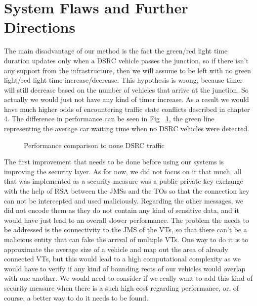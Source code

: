 \documentclass[17pt]{report}
\begin{document}
\section{System Flaws and Further Directions}
\indent \indent
The main disadvantage of our method is the fact the
green/red light time duration updates only when a DSRC vehicle
passes the junction, so if there isn't any support from the infrastructure,
then we will assume to be left with no green light/red light time increase/decrease.
This hypothesis is wrong, because timer will still decrease 
based on the number of vehicles that arrive at the junction. So actually
we would just not have any kind of timer increase. As a result we would 
have much higher odds of encountering traffic state conflicts described in 
chapter 4. The difference in performance can be seen in Fig 
~\ref{fig:All Optimizer vs no timer duration update}, the green line 
representing the average car waiting time when no DSRC vehicles were 
detected.
\begin{figure}[h!]
    \centering
    \label{fig:All Optimizer vs no timer duration update}
    \caption{Performance comparison to none DSRC traffic}
\end{figure}

\indent 
The first improvement that needs to be done before using our systems is 
improving the security layer. As for now, we did not focus on it
that much, all that was implemented as a security measure was a 
public private key exchange with the help of RSA between the JMSs 
and the TOs so that the connection key can not be intercepted
and used maliciously. Regarding the other messages, we did not 
encode them as they do not contain any kind of sensitive data, and 
it would have just lead to an overall slower performance. The problem  
the needs to be addressed is the connectivity to the JMS of the VTs, so 
that there can't be a malicious entity that can fake the arrival of
multiple VTs. One way to do it is to approximate the average size of
a vehicle and map out the area of already connected VTs,
but this would lead to a high computational complexity as we
would have to verify if any kind of bounding rects of our vehicles
would overlap with one another. We would need to consider if we
really want to add this kind of security measure when there is a
such high cost regarding performance, or, of course, a better way
to do it needs to be found. 
\end{document}

